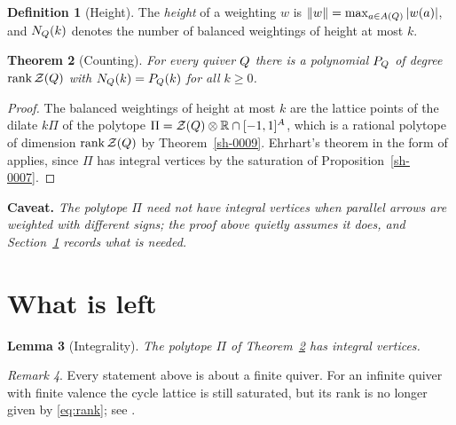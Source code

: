 \documentclass[11pt]{amsart}
\theoremstyle{plain}
\newtheorem{theorem}{Theorem}[section]
\newtheorem{lemma}[theorem]{Lemma}
\theoremstyle{definition}
\newtheorem{definition}[theorem]{Definition}
\theoremstyle{remark}
\newtheorem{remark}[theorem]{Remark}
\newenvironment{caveat}{\par\medskip\noindent\textbf{Caveat.}\begingroup\itshape}{\endgroup\par\medskip}
\begin{document}
\begin{definition}[Height]\label{sh-000B}
The \emph{height} of a weighting $w$ is $\|w\| = \max_{a \in A(Q)} |w(a)|$, and $N_{Q}(k)$ denotes the number of balanced weightings of height at most $k$.
\end{definition}


\begin{theorem}[Counting]\label{sh-000C}
For every quiver $Q$ there is a polynomial $P_{Q}$ of degree $\operatorname{rank} \mathcal{Z}(Q)$ with $N_{Q}(k) = P_{Q}(k)$ for all $k \geq 0$.
\end{theorem}
\begin{proof}
The balanced weightings of height at most $k$ are the lattice points of the dilate $k \Pi$ of the polytope $\Pi = \mathcal{Z}(Q) \otimes \mathbb{R} \cap [-1,1]^{A}$, which is a rational polytope of dimension $\operatorname{rank} \mathcal{Z}(Q)$ by Theorem~\ref{sh-0009}. Ehrhart's theorem in the form of \cite[Theorem 3.2]{Bellamy19} applies, since $\Pi$ has integral vertices by the saturation of Proposition~\ref{sh-0007}.
\end{proof}


\begin{caveat}\label{sh-000D}
The polytope $\Pi$ need not have integral vertices when parallel arrows are weighted with different signs; the proof above quietly assumes it does, and Section~\ref{sh-0400} records what is needed.
\end{caveat}


\section{What is left}\label{sh-0400}

\begin{lemma}[Integrality]\label{sh-000E}
The polytope $\Pi$ of Theorem~\ref{sh-000C} has integral vertices.
\end{lemma}


\begin{remark}\label{sh-000F}
Every statement above is about a finite quiver. For an infinite quiver with finite valence the cycle lattice is still saturated, but its rank is no longer given by \eqref{eq:rank}; see \cite{Cortez07}.
\end{remark}




\end{document}
